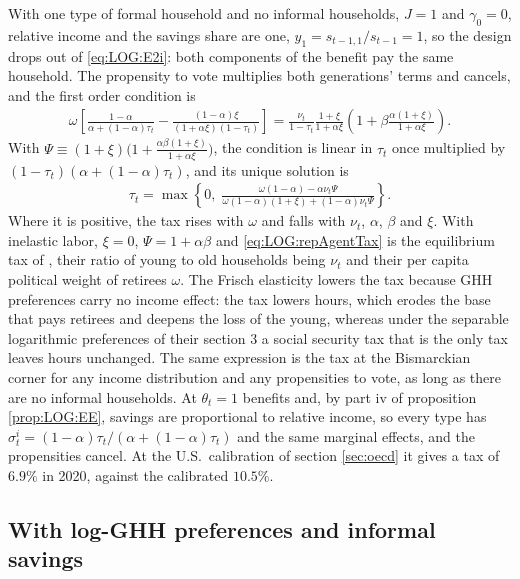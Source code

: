  With one type of formal household and no informal households, $J = 1$ and $\gamma_0 = 0$, relative income and the savings share are one, $y_1 = s_{t-1,1}/s_{t-1} = 1$, so the design drops out of \eqref{eq:LOG:E2i}: both components of the benefit pay the same household. The propensity to vote multiplies both generations' terms and cancels, and the first order condition is
\begin{align*}
    \omega\left[\frac{1-\alpha}{\alpha+(1-\alpha)\tau_t}-\frac{(1-\alpha)\xi}{(1+\alpha\xi)(1-\tau_t)}\right] = \frac{\nu_t}{1-\tau_t}\frac{1+\xi}{1+\alpha\xi}\left(1+\beta\frac{\alpha(1+\xi)}{1+\alpha\xi}\right).
\end{align*}
With $\Psi \equiv (1+\xi)\big(1+\frac{\alpha\beta(1+\xi)}{1+\alpha\xi}\big)$, the condition is linear in $\tau_t$ once multiplied by $(1-\tau_t)(\alpha+(1-\alpha)\tau_t)$, and its unique solution is
\begin{align}\label{eq:LOG:repAgentTax}
    \tau_t = \max\left\{0,\;\frac{\omega(1-\alpha)-\alpha\nu_t\Psi}{\omega(1-\alpha)(1+\xi)+(1-\alpha)\nu_t\Psi}\right\}.
\end{align}
Where it is positive, the tax rises with $\omega$ and falls with $\nu_t$, $\alpha$, $\beta$ and $\xi$. With inelastic labor, $\xi = 0$, $\Psi = 1+\alpha\beta$ and \eqref{eq:LOG:repAgentTax} is the equilibrium tax of \textcite{mkvss08}, their ratio of young to old households being $\nu_t$ and their per capita political weight of retirees $\omega$. The Frisch elasticity lowers the tax because GHH preferences carry no income effect: the tax lowers hours, which erodes the base that pays retirees and deepens the loss of the young, whereas under the separable logarithmic preferences of their section 3 a social security tax that is the only tax leaves hours unchanged. The same expression is the tax at the Bismarckian corner for any income distribution and any propensities to vote, as long as there are no informal households. At $\theta_t = 1$ benefits and, by part iv of proposition \ref{prop:LOG:EE}, savings are proportional to relative income, so every type has $\sigma_t^i = (1-\alpha)\tau_t/(\alpha+(1-\alpha)\tau_t)$ and the same marginal effects, and the propensities cancel. At the U.S.\ calibration of section \ref{sec:oecd} it gives a tax of $6.9\%$ in 2020, against the calibrated $10.5\%$.



\subsection{With log-GHH preferences and informal savings}\label{app:PEE:LOG_s0}


